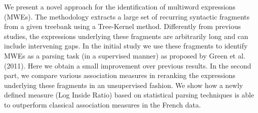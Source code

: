 We present a novel approach for the identification of multiword expressions (MWEs). The methodology extracts a large set of recurring syntactic fragments from a given treebank using a Tree-Kernel method. Differently from previous studies, the expressions underlying these fragments are arbitrarily long and can include intervening gaps. In the initial study we use these fragments to identify MWEs as a parsing task (in a supervised manner) as proposed by Green et al. (2011). Here we obtain a small improvement over previous results. In the second part, we compare various association measures in reranking the expressions underlying these fragments in an unsupervised fashion. We show how a newly defined measure (Log Inside Ratio) based on statistical parsing techniques is able to outperform classical association measures in the French data.
